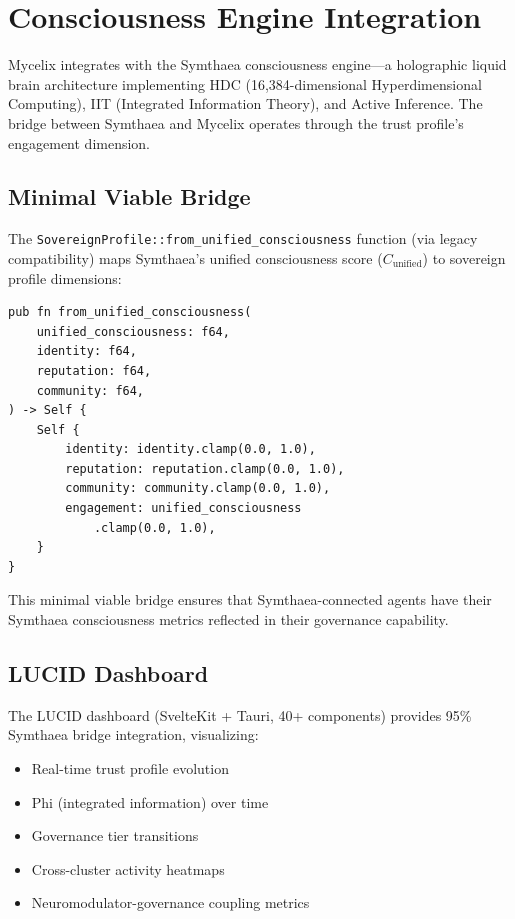 \documentclass[12pt]{book}
\begin{document}
\section{Consciousness Engine Integration}

Mycelix integrates with the Symthaea consciousness engine---a holographic
liquid brain architecture implementing HDC (16,384-dimensional
Hyperdimensional Computing), IIT (Integrated Information Theory), and
Active Inference. The bridge between Symthaea and Mycelix operates through
the trust profile's engagement dimension.

\subsection{Minimal Viable Bridge}

The \texttt{SovereignProfile::from\_unified\_consciousness} function (via legacy compatibility)
maps Symthaea's unified consciousness score ($C_{\text{unified}}$) to
sovereign profile dimensions:

\begin{lstlisting}
pub fn from_unified_consciousness(
    unified_consciousness: f64,
    identity: f64,
    reputation: f64,
    community: f64,
) -> Self {
    Self {
        identity: identity.clamp(0.0, 1.0),
        reputation: reputation.clamp(0.0, 1.0),
        community: community.clamp(0.0, 1.0),
        engagement: unified_consciousness
            .clamp(0.0, 1.0),
    }
}
\end{lstlisting}

This minimal viable bridge ensures that Symthaea-connected agents have their
Symthaea consciousness metrics reflected in their governance capability.

\subsection{LUCID Dashboard}

The LUCID dashboard (SvelteKit + Tauri, 40+ components) provides 95\%
Symthaea bridge integration, visualizing:

\begin{itemize}
  \item Real-time trust profile evolution
  \item Phi (integrated information) over time
  \item Governance tier transitions
  \item Cross-cluster activity heatmaps
  \item Neuromodulator-governance coupling metrics
\end{itemize}
\end{document}
